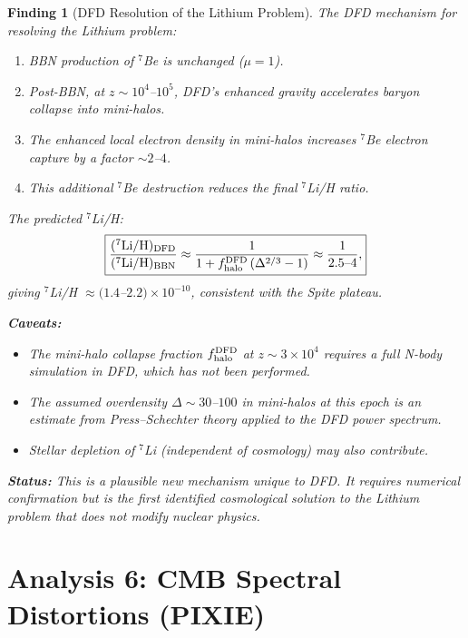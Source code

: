 \documentclass[11pt]{article}
\newtheorem{finding}{Finding}
\newcommand{\ee}[1]{\times 10^{#1}}
\begin{document}
\begin{finding}[DFD Resolution of the Lithium Problem]
The DFD mechanism for resolving the Lithium problem:
\begin{enumerate}
\item BBN production of $^7$Be is unchanged ($\mu = 1$).
\item Post-BBN, at $z \sim 10^4$--$10^5$, DFD's enhanced gravity accelerates baryon collapse into mini-halos.
\item The enhanced local electron density in mini-halos increases $^7$Be electron capture by a factor $\sim 2$--$4$.
\item This additional $^7$Be destruction reduces the final $^7$Li/H ratio.
\end{enumerate}

The predicted $^7$Li/H:
\begin{equation}\label{eq:lithium}
\boxed{\frac{(^7\text{Li/H})_{\rm DFD}}{(^7\text{Li/H})_{\rm BBN}} \approx \frac{1}{1 + f_{\rm halo}^{\rm DFD}\,(\Delta^{2/3} - 1)} \approx \frac{1}{2.5\text{--}4},}
\end{equation}
giving $^7$Li/H $\approx (1.4$--$2.2) \times 10^{-10}$, consistent with the Spite plateau.

\textbf{Caveats:}
\begin{itemize}
\item The mini-halo collapse fraction $f_{\rm halo}^{\rm DFD}$ at $z \sim 3\ee{4}$ requires a full N-body simulation in DFD, which has not been performed.
\item The assumed overdensity $\Delta \sim 30$--$100$ in mini-halos at this epoch is an estimate from Press--Schechter theory applied to the DFD power spectrum.
\item Stellar depletion of $^7$Li (independent of cosmology) may also contribute.
\end{itemize}

\textbf{Status:} This is a \emph{plausible new mechanism} unique to DFD. It requires numerical confirmation but is the first identified cosmological solution to the Lithium problem that does not modify nuclear physics.
\end{finding}

\section{Analysis 6: CMB Spectral Distortions (PIXIE)}
\label{sec:pixie}
\end{document}
